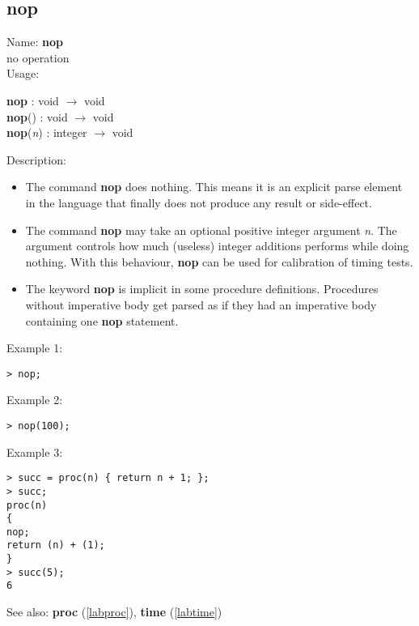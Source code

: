 \subsection{nop}
\label{labnop}
\noindent Name: \textbf{nop}\\
\phantom{aaa}no operation\\[0.2cm]
\noindent Usage: 
\begin{center}
\textbf{nop} : \textsf{void} $\rightarrow$ \textsf{void}\\
\textbf{nop}() : \textsf{void} $\rightarrow$ \textsf{void}\\
\textbf{nop}(\emph{n}) : \textsf{integer} $\rightarrow$ \textsf{void}\\
\end{center}
\noindent Description: \begin{itemize}

\item The command \textbf{nop} does nothing. This means it is an explicit parse
   element in the \sollya language that finally does not produce any
   result or side-effect.

\item The command \textbf{nop} may take an optional positive integer argument \emph{n}. The argument controls how much (useless) integer additions \sollya performs while doing nothing. 
   With this behaviour, \textbf{nop} can be used for calibration of timing tests.

\item The keyword \textbf{nop} is implicit in some procedure
   definitions. Procedures without imperative body get parsed as if they
   had an imperative body containing one \textbf{nop} statement.
\end{itemize}
\noindent Example 1: 
\begin{center}\begin{minipage}{15cm}\begin{Verbatim}[frame=single]
> nop;
\end{Verbatim}
\end{minipage}\end{center}
\noindent Example 2: 
\begin{center}\begin{minipage}{15cm}\begin{Verbatim}[frame=single]
> nop(100);
\end{Verbatim}
\end{minipage}\end{center}
\noindent Example 3: 
\begin{center}\begin{minipage}{15cm}\begin{Verbatim}[frame=single]
> succ = proc(n) { return n + 1; };
> succ;
proc(n)
{
nop;
return (n) + (1);
}
> succ(5);
6
\end{Verbatim}
\end{minipage}\end{center}
See also: \textbf{proc} (\ref{labproc}), \textbf{time} (\ref{labtime})
